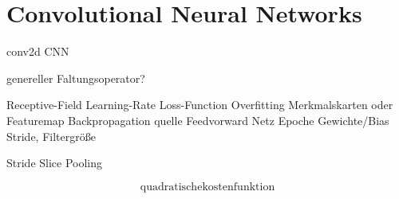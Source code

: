 \section{Convolutional Neural Networks}
\label{convolutional_neural_networks}


\gls{conv2d}
\gls{CNN}

genereller Faltungsoperator?

Receptive-Field
Learning-Rate
Loss-Function
Overfitting
Merkmalskarten oder Featuremap
Backpropagation quelle
Feedvorward Netz
Epoche
Gewichte/Bias
Stride, Filtergröße

Stride Slice Pooling


\begin{equation*}
  \mathrm{quadratische kostenfunktion}
  \label{eq:quadratische_kostenfunktion}
\end{equation*}
